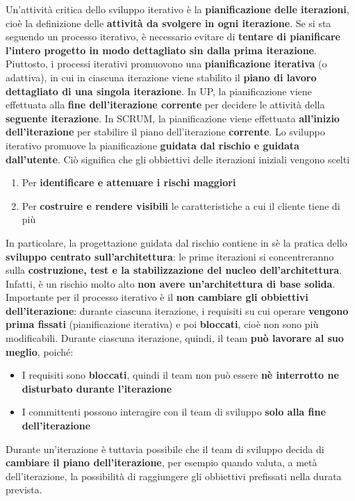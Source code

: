 \documentclass[12pt]{article}
\begin{document}
Un'attività critica dello sviluppo iterativo è la \textbf{pianificazione delle iterazioni}, cioè la definizione delle \textbf{attività da svolgere in ogni iterazione}.
Se si sta seguendo un processo iterativo, è necessario evitare di \textbf{tentare di pianificare l'intero progetto in modo dettagliato sin dalla prima iterazione}.
Piuttosto, i processi iterativi promuovono una \textbf{pianificazione iterativa} (o adattiva), in cui in ciascuna iterazione viene stabilito il \textbf{piano di lavoro dettagliato di una singola iterazione}.
In UP, la pianificazione viene effettuata alla \textbf{fine dell'iterazione corrente} per decidere le attività della \textbf{seguente iterazione}. In SCRUM, la pianificazione viene effettuata \textbf{all'inizio dell'iterazione} per stabilire il piano dell'iterazione \textbf{corrente}.
Lo sviluppo iterativo promuove la pianificazione \textbf{guidata dal rischio e guidata dall'utente}.
Ciò significa che gli obbiettivi delle iterazioni iniziali vengono scelti
\begin{enumerate}
    \item Per \textbf{identificare e attenuare i rischi maggiori}
    \item Per \textbf{costruire e rendere visibili} le caratteristiche a cui il cliente tiene di più
\end{enumerate}
In particolare, la progettazione guidata dal rischio contiene in sè la pratica dello \textbf{sviluppo centrato sull'architettura}: le prime iterazioni si concentreranno sulla \textbf{costruzione, test e la stabilizzazione del nucleo dell'architettura}.
Infatti, è un rischio molto alto \textbf{non avere un'architettura di base solida}. \newline
Importante per il processo iterativo è il \textbf{non cambiare gli obbiettivi dell'iterazione}: durante ciascuna iterazione, i requisiti su cui operare \textbf{vengono prima fissati} (pianificazione iterativa) e poi \textbf{bloccati}, cioè non sono più modificabili.
Durante ciascuna iterazione, quindi, il team \textbf{può lavorare al suo meglio}, poiché:
\begin{itemize}
    \item I requisiti sono \textbf{bloccati}, quindi il team non può essere \textbf{nè interrotto ne disturbato durante l'iterazione}
    \item I committenti possono interagire con il team di sviluppo \textbf{solo alla fine dell'iterazione}
\end{itemize}
Durante un'iterazione è tuttavia possibile che il team di sviluppo decida di \textbf{cambiare il piano dell'iterazione}, per esempio quando valuta, a metà dell'iterazione, la possibilità di raggiungere gli obbiettivi prefissati nella durata prevista.
\end{document}
